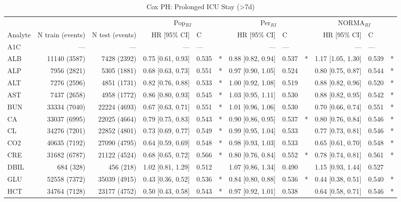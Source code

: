 \begin{table}[ht]
\centering
\footnotesize
\caption{Cox PH: Prolonged ICU Stay (>7d)}
\begin{tabular}{lrrrlcrlcrlc}
\toprule
 & &  & \multicolumn{3}{c}{Pop$_{RI}$} & \multicolumn{3}{c}{Per$_{RI}$} & \multicolumn{3}{c}{NORMA$_{RI}$} \\
\cmidrule(lr){4-6} \cmidrule(lr){7-9} \cmidrule(lr){10-12}
Analyte & N train (events) & N test (events) & HR [95\% CI] & C &  & HR [95\% CI] & C &  & HR [95\% CI] & C &  \\
\midrule
A1C & --- & --- & --- & --- &  & --- & --- &  & --- & --- &  \\
ALB & 11140 (3587) & 7428 (2392) & 0.75 [0.61, 0.93] & 0.535 & * & 0.88 [0.82, 0.94] & 0.537 & * & 1.17 [1.05, 1.30] & 0.539 & * \\
ALP & 7956 (2821) & 5305 (1881) & 0.68 [0.63, 0.73] & 0.551 & * & 0.97 [0.90, 1.05] & 0.524 &  & 0.80 [0.75, 0.87] & 0.544 & * \\
ALT & 7276 (2596) & 4851 (1731) & 0.82 [0.76, 0.88] & 0.533 & * & 1.00 [0.92, 1.08] & 0.519 &  & 0.88 [0.82, 0.96] & 0.520 & * \\
AST & 7437 (2658) & 4958 (1772) & 0.86 [0.80, 0.93] & 0.545 & * & 1.03 [0.95, 1.11] & 0.530 &  & 0.88 [0.82, 0.95] & 0.542 & * \\
BUN & 33334 (7040) & 22224 (4693) & 0.67 [0.63, 0.71] & 0.551 & * & 1.01 [0.96, 1.06] & 0.530 &  & 0.70 [0.66, 0.74] & 0.551 & * \\
CA & 33037 (6995) & 22025 (4664) & 0.79 [0.75, 0.83] & 0.543 & * & 0.90 [0.86, 0.95] & 0.537 & * & 0.80 [0.76, 0.84] & 0.546 & * \\
CL & 34276 (7201) & 22852 (4801) & 0.73 [0.69, 0.77] & 0.549 & * & 0.99 [0.95, 1.04] & 0.533 &  & 0.77 [0.73, 0.81] & 0.546 & * \\
CO2 & 40635 (7192) & 27090 (4795) & 0.64 [0.59, 0.69] & 0.548 & * & 0.98 [0.93, 1.03] & 0.533 &  & 0.65 [0.61, 0.70] & 0.548 & * \\
CRE & 31682 (6787) & 21122 (4524) & 0.68 [0.65, 0.72] & 0.566 & * & 0.80 [0.76, 0.84] & 0.552 & * & 0.78 [0.74, 0.81] & 0.561 & * \\
DBIL & 684 (328) & 456 (218) & 1.02 [0.81, 1.29] & 0.512 &  & 1.07 [0.86, 1.34] & 0.490 &  & 1.15 [0.93, 1.44] & 0.527 &  \\
GLU & 52558 (7372) & 35039 (4915) & 0.43 [0.36, 0.52] & 0.536 & * & 0.84 [0.80, 0.88] & 0.536 & * & 0.44 [0.38, 0.51] & 0.540 & * \\
HCT & 34764 (7128) & 23177 (4752) & 0.50 [0.43, 0.58] & 0.543 & * & 0.97 [0.92, 1.01] & 0.538 &  & 0.64 [0.58, 0.71] & 0.546 & * \\

\end{tabular}
\end{table}
